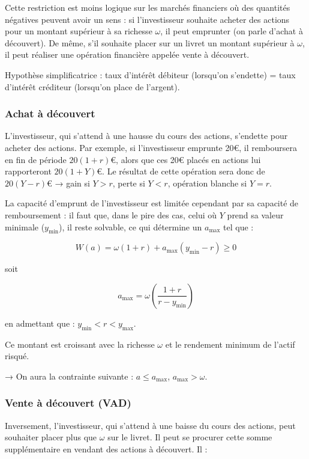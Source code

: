 \documentclass[a4paper, 12pt]{report}
\begin{document}
Cette restriction est moins logique sur les marchés financiers où des quantités négatives peuvent avoir un sens : si l'investisseur souhaite acheter des actions pour un montant supérieur à sa richesse \( \omega \), il peut emprunter (on parle d'achat à découvert). De même, s'il souhaite placer sur un livret un montant supérieur à \( \omega \), il peut réaliser une opération financière appelée vente à découvert.

Hypothèse simplificatrice : taux d'intérêt débiteur (lorsqu'on s'endette) = taux d'intérêt créditeur (lorsqu'on place de l'argent).

\subsubsection{Achat à découvert}

L'investisseur, qui s'attend à une hausse du cours des actions, s'endette pour acheter des actions. Par exemple, si l'investisseur emprunte 20€, il remboursera en fin de période \( 20 (1 + r) \)€, alors que ces 20€ placés en actions lui rapporteront \( 20 (1 + Y) \)€. Le résultat de cette opération sera donc de \( 20 (Y - r) \)€ → gain si \( Y > r \), perte si \( Y < r \), opération blanche si \( Y = r \).

La capacité d'emprunt de l'investisseur est limitée cependant par sa capacité de remboursement : il faut que, dans le pire des cas, celui où \( Y \) prend sa valeur minimale (\( y_{\text{min}} \)), il reste solvable, ce qui détermine un \( a_{\text{max}} \) tel que :

\[
W(a) = \omega (1 + r) + a_{\text{max}} (y_{\text{min}} - r) \geq 0
\]

soit 

\[
a_{\text{max}} = \omega\left( \frac{ 1 + r}{r - y_{\text{min}}}\right) 
\]

en admettant que : \( y_{\text{min}} < r < y_{\text{max}} \).

Ce montant est croissant avec la richesse \( \omega \) et le rendement minimum de l'actif risqué.

→ On aura la contrainte suivante : \( a \leq a_{\text{max}} \), \( a_{\text{max}} > \omega \).


\subsubsection{Vente à découvert (VAD)}
	
Inversement, l'investisseur, qui s'attend à une baisse du cours des actions, peut souhaiter placer plus que \( \omega \) sur le livret. Il peut se procurer cette somme supplémentaire en vendant des actions à découvert. Il :
\end{document}
